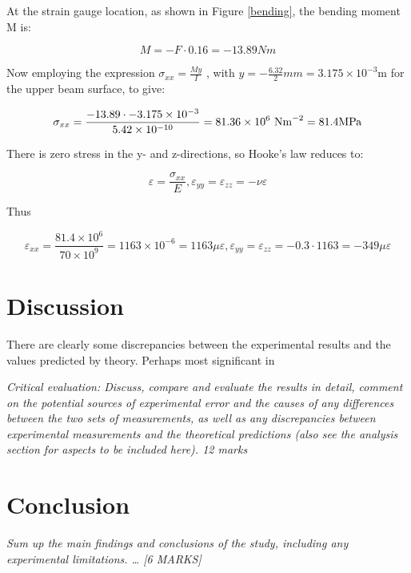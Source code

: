 \documentclass[12pt]{article}
\begin{document}
At the strain gauge location, as shown in Figure \ref{bending}, the bending moment M is:

\begin{equation}
M = -F \cdot 0.16 = -13.89 Nm
\end{equation}

Now employing the expression $\sigma_{xx} = \frac{My}{I}$ \cite{bendingtheory}, with $y = -\frac{6.32}{2}mm = 3.175\times 10^{-3}$m for the upper beam surface, to give:

\begin{equation}
\sigma_{xx} = \frac{-13.89 \cdot -3.175\times 10^{-3}}{5.42\times 10^{-10}} = 81.36\times 10^6 \textnormal{ Nm}^{-2} = 81.4\textnormal{MPa}
\end{equation}

There is zero stress in the y- and z-directions, so Hooke's law reduces to:

\begin{equation}
\varepsilon = \frac{\sigma_{xx}}{E}, \varepsilon_{yy} = \varepsilon_{zz} = - \nu \varepsilon
\end{equation}

Thus

\begin{equation}
\varepsilon_{xx} = \frac{81.4\times 10^6}{70\times 10^9} = 1163\times 10^{-6} = 1163\mu \varepsilon, \varepsilon_{yy} = \varepsilon_{zz} = -0.3 \cdot 1163 = -349 \mu \varepsilon
\end{equation}

\section{Discussion}

There are clearly some discrepancies between the experimental results and the values predicted by theory. Perhaps most significant in 

\emph{Critical evaluation: Discuss, compare and evaluate the results in detail, comment on the potential sources of experimental error and the causes of any differences between the two sets of measurements, as well as any discrepancies  between experimental measurements and the theoretical predictions (also see the analysis section for aspects to be included here). 12 marks}
\section{Conclusion}
\emph{Sum up the main findings and conclusions of the study, including any experimental limitations.
…
[6 MARKS]
}
\newpage
\end{document}
